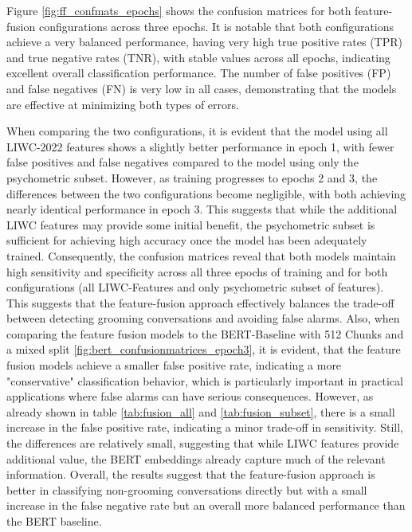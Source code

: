 Figure \ref{fig:ff_confmats_epochs} shows the confusion matrices for both feature-fusion configurations across three epochs. It is notable that both configurations achieve a very balanced performance, having very high true positive rates (TPR) and true negative rates (TNR), with stable values across all epochs, indicating excellent overall classification performance. The number of false positives (FP) and false negatives (FN) is very low in all cases, demonstrating that the models are effective at minimizing both types of errors. 

When comparing the two configurations, it is evident that the model using all LIWC-2022 features shows a slightly better performance in epoch 1, with fewer false positives and false negatives compared to the model using only the psychometric subset. However, as training progresses to epochs 2 and 3, the differences between the two configurations become negligible, with both achieving nearly identical performance in epoch 3. This suggests that while the additional LIWC features may provide some initial benefit, the psychometric subset is sufficient for achieving high accuracy once the model has been adequately trained. Consequently, the confusion matrices reveal that both models maintain high sensitivity and specificity across all three epochs of training and for both configurations (all LIWC-Features and only psychometric subset of features). This suggests that the feature-fusion approach effectively balances the trade-off between detecting grooming conversations and avoiding false alarms. Also, when comparing the feature fusion models to the BERT-Baseline with 512 Chunks and a mixed split \ref{fig:bert_confusionmatrices_epoch3}, it is evident, that the feature fusion models achieve a smaller false positive rate, indicating a more "conservative" classification behavior, which is particularly important in practical applications where false alarms can have serious consequences. However, as already shown in table \ref{tab:fusion_all} and \ref{tab:fusion_subset}, there is a small increase in the false positive rate, indicating a minor trade-off in sensitivity. Still, the differences are relatively small, suggesting that while LIWC features provide additional value, the BERT embeddings already capture much of the relevant information. Overall, the results suggest that the feature-fusion approach is better in classifying non-grooming conversations directly but with a small increase in the false negative rate but an overall more balanced performance than the BERT baseline.


